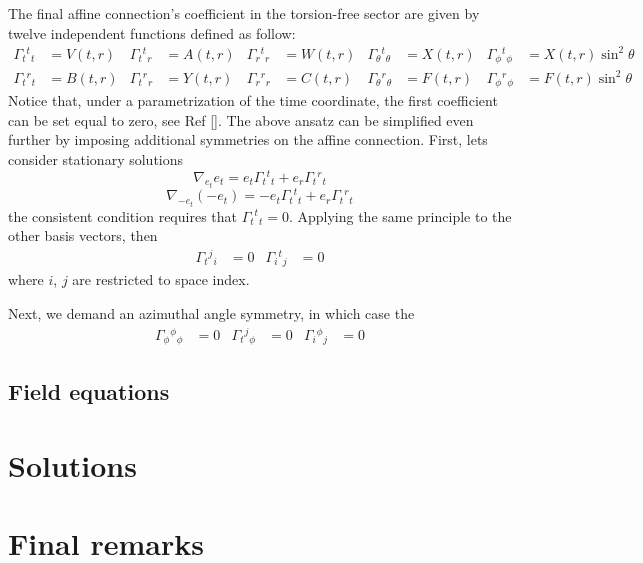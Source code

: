 \documentclass{article}
\providecommand{\ctG}[3]{\Gamma_{#1}{}^{ #2}{}_{#3}}
\begin{document}
The final affine connection's coefficient in the torsion-free sector are given by
twelve independent functions defined as follow:
\begin{equation}
\begin{aligned}
    \ctG{t}{t}{t} & = V(t,r) & \ctG{t}{t}{r} & = A(t,r) & \ctG{r}{t}{r} & = W(t,r) & \ctG{\theta}{t}{\theta} & = X(t,r) & \ctG{\phi}{t}{\phi} & = X(t,r)\sin^2\theta \\
    \ctG{t}{r}{t} & = B(t,r) & \ctG{t}{r}{r} & = Y(t,r) & \ctG{r}{r}{r} & = C(t,r) & \ctG{\theta}{r}{\theta} & = F(t,r) & \ctG{\phi}{r}{\phi} & = F(t,r)\sin^2\theta 
\end{aligned}
\end{equation}
Notice that, under a parametrization of the time coordinate, the first coefficient
can be set equal to zero, see Ref []. The above ansatz can be simplified even further 
by imposing additional symmetries on the affine connection. First, lets consider 
stationary solutions
\begin{equation}
    \nabla_{e_t}e_t = e_t\ctG{t}{t}{t} + e_r\ctG{t}{r}{t}
\end{equation}
\begin{equation}
    \nabla_{-e_t}\left(-e_t\right) = -e_t\ctG{t}{t}{t} + e_r\ctG{t}{r}{t}
\end{equation}
the consistent condition requires that $\ctG{t}{t}{t} = 0$. Applying the same principle
to the other basis vectors, then
\begin{align}
    \ctG{t}{j}{i} & = 0 & \ctG{i}{t}{j} & = 0
\end{align}
where $i$, $j$ are restricted to space index.

Next, we demand an azimuthal angle symmetry, in which case the
\begin{align}
    \ctG{\phi}{\phi}{\phi} & = 0 & \ctG{t}{j}{\phi} & = 0 & \ctG{i}{\phi}{j} & = 0
\end{align}

\subsection{Field equations}



\section{Solutions}
\label{sec:solutions}


\section{Final remarks}
\label{sec:final_remarks}
\end{document}
